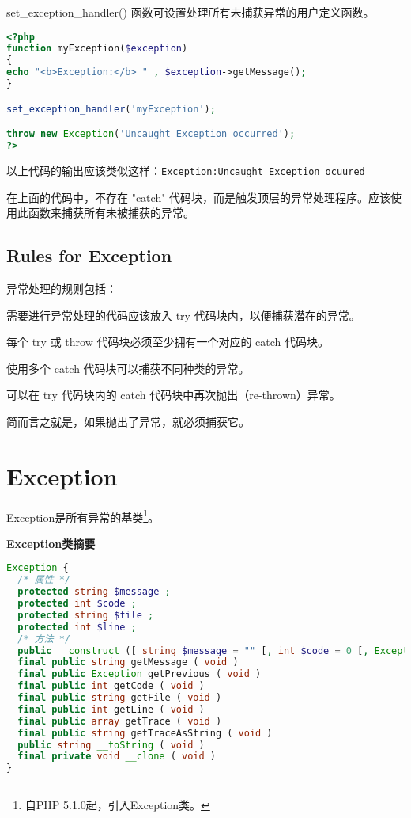 set\_exception\_handler() 函数可设置处理所有未捕获异常的用户定义函数。

\begin{lstlisting}[language=PHP]
<?php
function myException($exception)
{
echo "<b>Exception:</b> " , $exception->getMessage();
}

set_exception_handler('myException');

throw new Exception('Uncaught Exception occurred');
?>
\end{lstlisting}

以上代码的输出应该类似这样：\verb|Exception:Uncaught Exception ocuured|

在上面的代码中，不存在 "catch" 代码块，而是触发顶层的异常处理程序。应该使用此函数来捕获所有未被捕获的异常。





\section{Rules for Exception}

异常处理的规则包括：

\begin{compactitem}
\item 需要进行异常处理的代码应该放入 try 代码块内，以便捕获潜在的异常。
\item 每个 try 或 throw 代码块必须至少拥有一个对应的 catch 代码块。
\item 使用多个 catch 代码块可以捕获不同种类的异常。
\item 可以在 try 代码块内的 catch 代码块中再次抛出（re-thrown）异常。
\end{compactitem}

简而言之就是，如果抛出了异常，就必须捕获它。


\chapter{Exception}


Exception是所有异常的基类\footnote{自PHP 5.1.0起，引入Exception类。}。

\textbf{Exception类摘要}

\begin{lstlisting}[language=PHP]
Exception {
  /* 属性 */
  protected string $message ;
  protected int $code ;
  protected string $file ;
  protected int $line ;
  /* 方法 */
  public __construct ([ string $message = "" [, int $code = 0 [, Exception $previous = NULL ]]] )
  final public string getMessage ( void )
  final public Exception getPrevious ( void )
  final public int getCode ( void )
  final public string getFile ( void )
  final public int getLine ( void )
  final public array getTrace ( void )
  final public string getTraceAsString ( void )
  public string __toString ( void )
  final private void __clone ( void )
}
\end{lstlisting}



